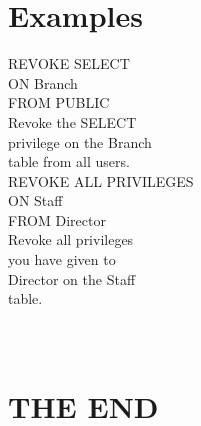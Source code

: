 \documentclass[12pt]{article}
\begin{document}
\section{Examples}
REVOKE SELECT\\
ON Branch\\
FROM PUBLIC\\
Revoke the SELECT \\
privilege on the Branch \\
table from all users.\\
REVOKE ALL PRIVILEGES\\
ON Staff\\
FROM Director\\
Revoke all privileges \\
you have given to \\
Director on the Staff \\
table.\\
\\ 
 \\
\section{THE END}
\newpage
\\ 
\end{document}
